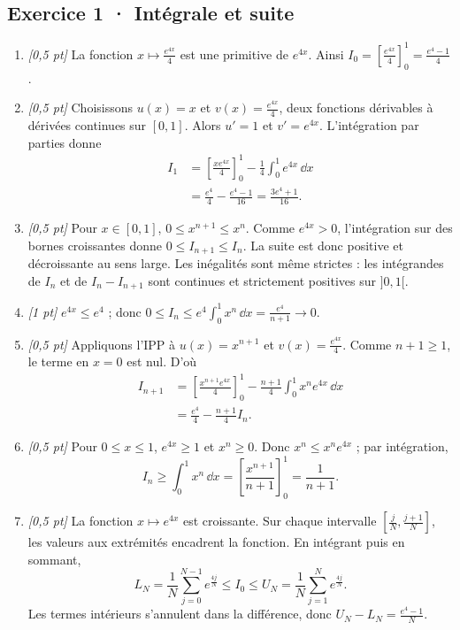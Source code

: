 \subsection*{Exercice 1 · Intégrale et suite}\begin{enumerate}

\item \textit{[0{,}5 pt]} La fonction $x\mapsto \frac{e^{4x}}{4}$ est une primitive de $e^{4x}$. Ainsi $I_0=[\frac{e^{4x}}{4}]_0^1=\frac{e^{4}-1}{4}$.

\item \textit{[0{,}5 pt]} Choisissons $u(x)=x$ et $v(x)=\frac{e^{4x}}{4}$, deux fonctions dérivables à dérivées continues sur $[0,1]$. Alors $u'=1$ et $v'=e^{4x}$. L'intégration par parties donne
\[\begin{aligned}I_1&=\left[\frac{xe^{4x}}{4}\right]_0^1-\frac{1}{4}\int_0^1e^{4x}\,\dd x\\&=\frac{e^{4}}{4}-\frac{e^{4}-1}{16}=\frac{3e^{4}+1}{16}.\end{aligned}\]

\item \textit{[0{,}5 pt]} Pour $x\in[0,1]$, $0\le x^{n+1}\le x^n$. Comme $e^{4x}>0$, l'intégration sur des bornes croissantes donne $0\le I_{n+1}\le I_n$. La suite est donc positive et décroissante au sens large. Les inégalités sont même strictes : les intégrandes de $I_n$ et de $I_n-I_{n+1}$ sont continues et strictement positives sur $]0,1[$.

\item \textit{[1 pt]} $e^{4x}\le e^{4}$ ; donc $0\le I_n\le e^{4}\int_0^1x^n\,\dd x=\frac{e^{4}}{n+1}\to0$.

\item \textit{[0{,}5 pt]} Appliquons l'IPP à $u(x)=x^{n+1}$ et $v(x)=\frac{e^{4x}}{4}$. Comme $n+1\ge1$, le terme en $x=0$ est nul. D'où
\[\begin{aligned}I_{n+1}&=\left[\frac{x^{n+1}e^{4x}}{4}\right]_0^1-\frac{n+1}{4}\int_0^1x^ne^{4x}\,\dd x\\&=\frac{e^{4}}{4}-\frac{n+1}{4}I_n.\end{aligned}\]

\item \textit{[0{,}5 pt]} Pour $0\le x\le1$, $e^{4x}\ge1$ et $x^n\ge0$. Donc $x^n\le x^ne^{4x}$ ; par intégration,
\[I_n\ge\int_0^1x^n\,\dd x=\left[\frac{x^{n+1}}{n+1}\right]_0^1=\frac{1}{n+1}.\]

\item \textit{[0{,}5 pt]} La fonction $x\mapsto e^{4x}$ est croissante. Sur chaque intervalle $[\frac{j}{N},\frac{j+1}{N}]$, les valeurs aux extrémités encadrent la fonction. En intégrant puis en sommant,
\[L_N=\frac{1}{N}\sum_{j=0}^{N-1}e^{\frac{4j}{N}}\le I_0\le U_N=\frac{1}{N}\sum_{j=1}^Ne^{\frac{4j}{N}}.\]
Les termes intérieurs s'annulent dans la différence, donc $U_N-L_N=\frac{e^{4}-1}{N}$.


\end{enumerate}
